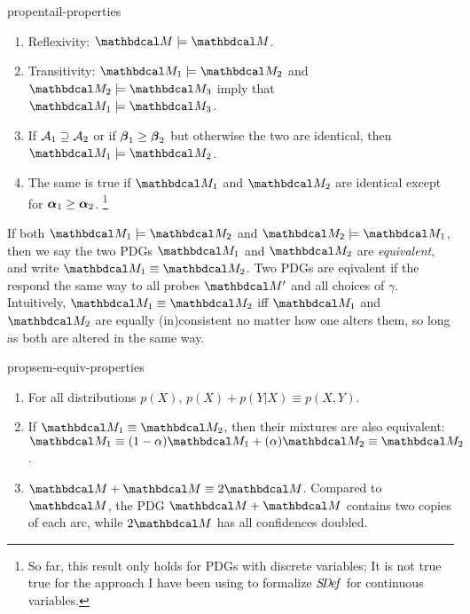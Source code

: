     \begin{linked}{prop}{entail-properties}
        \begin{enumerate}[parsep=0pt]
            \item Reflexivity: $\dg M \models \dg M$.
            \item Transitivity: $\dg M_1 \models \dg M_2$ and $\dg M_2 \models \dg M_3$ imply that $\dg M_1 \models \dg M_3$. 
            \item If 
                $\mathcal A_1 \supseteq \mathcal A_2$
                 or if $\boldsymbol\beta_1 \ge \boldsymbol\beta_2$ but otherwise the two are identical, then $\dg M_1 \models \dg M_2$. 
            \item The same is true if $\dg M_1$ and $\dg M_2$ are identical except for
            $\boldsymbol\alpha_1 \ge \boldsymbol\alpha_2$.%
                \footnote{
                So far, this result only holds for PDGs with discrete variables;
                It is not true true for the approach I have been using to
                formalize $\mathit{S\mskip-3.5muD\mskip-2.5mue\mskip-1.5muf}$ for continuous variables.
                }
        \end{enumerate}
    \end{linked}
    
    
    If both $\dg M_1 \models \dg M_2$ and $\dg M_2 \models \dg M_1$, 
        then we say the two PDGs $\dg M_1$ and $\dg M_2$ are \emph{equivalent}, and write $\dg M_1 \equiv \dg M_2$.
    Two PDGs are eqivalent if the respond the same way to all probes $\dg M'$ and all choices of $\gamma$.
    Intuitively, $\dg M_1 \equiv \dg M_2$ iff $\dg M_1$ and $\dg M_2$ are equally (in)consistent no matter how one alters them, so long as both are altered in the same way. 
    
    \begin{linked}{prop}{sem-equiv-properties}
        \begin{enumerate}[parsep=0pt]
        \item For all distributions $p(X)$, $p(X) + p(Y|X) \equiv p(X,Y)$. 
        \item If $\dg M_1 \equiv \dg M_2$, then their mixtures are also equivalent:
            $\dg M_1 \equiv (1-\alpha) \dg M_1 + (\alpha) \dg M_2 \equiv \dg M_2$. 
        \item $\dg M + \dg M \equiv 2 \dg M$. 
            Compared to $\dg M$, the PDG $\dg M + \dg M$ contains two copies of each arc, while $2 \dg M$ has all confidences doubled. 
    \end{enumerate}
    \end{linked}


